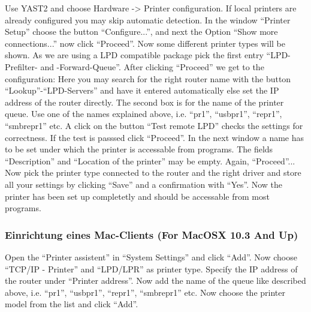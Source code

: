   Use YAST2 and choose Hardware -> Printer configuration. If local printers
  are already configured you may skip automatic detection. In the window
  ``Printer Setup'' choose the button ``Configure...'', and next the
  Option ``Show more connections...'' now click ``Proceed''.
  Now some different printer types will be shown. As we are using a LPD
  compatible package pick the first entry ``LPD-Prefilter- and -Forward-Queue''.
  After clicking ``Proceed'' we get to the configuration:
  Here you may search for the right router name with the button ``Lookup''-``LPD-Servers''
  and have it entered automatically else set the IP address of the router directly.
  The second box is for the name of the printer queue. Use one of the names
  explained above, i.e. ``pr1'', ``usbpr1'', ``repr1'', ``smbrepr1''
  etc. A click on the button ``Test remote LPD'' checks the settings for correctness.
  If the test is passsed click ``Proceed''. In the next window a name has to be set
  under which the printer is accessable from programs. The fields ``Description''
  and ``Location of the printer'' may be empty. Again, ``Proceed''...
  Now pick the printer type connected to the router and the right driver and
  store all your settings by clicking ``Save'' and a confirmation with ``Yes''.
  Now the printer has been set up completetly and should be accessable
  from most programs.

\subsubsection{Einrichtung eines Mac-Clients (For MacOSX 10.3 And Up)}

  Open the ``Printer assistent'' in ``System Settings'' and click ``Add''.
  Now choose ``TCP/IP - Printer'' and ``LPD/LPR'' as printer type. Specify the
  IP address of the router under ``Printer address''. Now add the name of
  the queue like described above, i.e. ``pr1'', ``usbpr1'', ``repr1'', ``smbrepr1''
  etc. Now choose the printer model from the list and click ``Add''.

